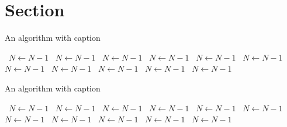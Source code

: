 \documentclass[a4paper]{article}
\begin{document}
\section{Section}

\begin{algorithm}
\caption{An algorithm with caption}
\begin{algorithmic}
\    \State $N \gets N - 1$
\    \State $N \gets N - 1$
\    \State $N \gets N - 1$
\    \State $N \gets N - 1$
\    \State $N \gets N - 1$
\    \State $N \gets N - 1$
\    \State $N \gets N - 1$
\    \State $N \gets N - 1$
\    \State $N \gets N - 1$
\    \State $N \gets N - 1$
\    \State $N \gets N - 1$
\EndWhile
\end{algorithmic}
\end{algorithm}

\begin{algorithm}
\caption{An algorithm with caption}
\begin{algorithmic}
\    \State $N \gets N - 1$
\    \State $N \gets N - 1$
\    \State $N \gets N - 1$
\    \State $N \gets N - 1$
\    \State $N \gets N - 1$
\    \State $N \gets N - 1$
\    \State $N \gets N - 1$
\    \State $N \gets N - 1$
\    \State $N \gets N - 1$
\    \State $N \gets N - 1$
\    \State $N \gets N - 1$
\EndWhile
\end{algorithmic}
\end{algorithm}
\end{document}
